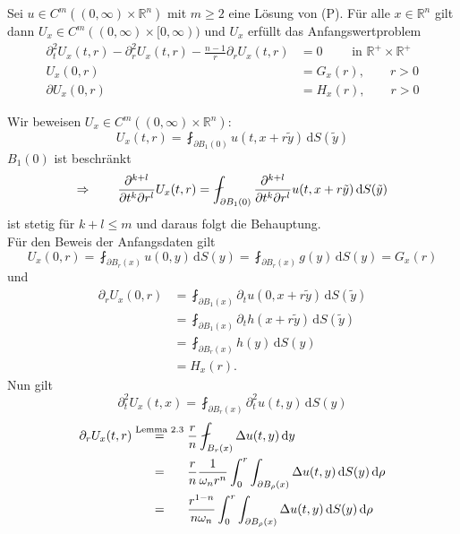 \begin{lemma}
	Sei $u \in C^m((0,\infty) \times \mathbb{R}^n)$ mit $m \geq 2$ eine Lösung von (P). Für alle $ x \in \mathbb{R}^n$ gilt dann $U_x \in C^m((0,\infty) \times [0,\infty))$ und $U_x$ erfüllt das Anfangswertproblem 
	\begin{align*}
		\partial_t^2 U_x(t,r)- \partial_r^2 U_x(t,r) - \frac{n-1}{r} \partial_r U_x(t,r) &= 0 \qquad \text{ in } \mathbb{R}^{+} \times \mathbb{R}^{+} \\
		U_x(0,r)&= G_x(r), \qquad r>0 \\
		\partial U_x(0,r) &= H_x(r), \qquad r>0
	\end{align*}
\end{lemma}
\begin{beweis}
Wir beweisen $U_x \in C^m((0,\infty) \times \mathbb{R}^n)$:
\[
	U_x(t,r) = \fint_{\partial B_1(0)}^{} u (t,x+r \tilde y) \,\mathrm{d}S(\tilde y)
\]	
$B_1(0)$ ist beschränkt
\[
	\Rightarrow \qquad \diff{^{k+l}}{t^k \partial r^l} U_x(t,r) = \fint_{\partial B_1(0)}^{} \diff{^{k+l}}{t^k \partial r^l} u(t,x+r \tilde y) \,\mathrm{d}S(\tilde y)
\]
ist stetig für $k+l \leq m$ und daraus folgt die Behauptung. \\ 
Für den Beweis der Anfangsdaten gilt
\[
	U_x(0,r) = \fint_{\partial B_r(x)}^{} u(0,y) \,\mathrm{d}S(y) = \fint_{\partial B_r(x)}^{} g(y) \,\mathrm{d}S(y) = G_x(r)
\]
und
\begin{align*}
	\partial_r U_x(0,r)& = \fint_{\partial B_1(x)}^{} \partial_t u(0,x+ r \tilde y) \,\mathrm{d}S(\tilde y) \\ &= 
	\fint_{\partial B_1(x)}^{} \partial_t h(x+ r \tilde y) \,\mathrm{d}S(\tilde y) \\ &= \fint_{\partial B_r(x)}^{} h(y) \,\mathrm{d}S(y) \\ &= H_x(r).
\end{align*}
Nun gilt
\[
	\partial_t^2U_x(t,x) = \fint_{\partial B_r(x)}^{} \partial_t^2 u(t,y) \,\mathrm{d}S(y)
\]
\begin{align*}
	\partial_r U_x(t,r) &\stackrel{\text{Lemma }2.3}{=} \frac{r}{n} \fint_{B_r(x)}^{} \Delta u(t,y) \,\mathrm{d}y \\
	& \stackrel{\hphantom{\text{Lemma }2.3}}{=} \frac{r}{n} \frac{1}{\omega_n r^n} \int_{0}^{r} \int_{\partial B_{\rho}(x)}^{} \Delta u(t,y) \,\mathrm{d}S(y) \,\mathrm{d}\rho \\
	& \stackrel{\hphantom{\text{Lemma }2.3}}{=} \frac{r^{1-n}}{n \omega_n} \int_{0}^{r} \int_{\partial B_{\rho}(x)}^{} \Delta u(t,y) \,\mathrm{d}S(y) \,\mathrm{d}\rho
\end{align*}


\end{beweis}
